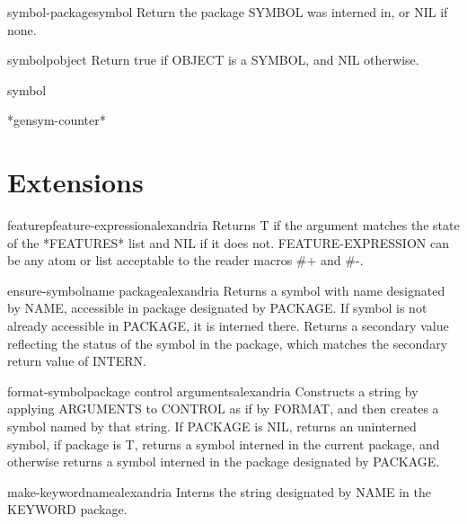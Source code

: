 \begin{function}{symbol-package}{symbol}{}{}
  Return the package SYMBOL was interned in, or NIL if none.
\end{function}

\begin{function}{symbolp}{object}{}{}
  Return true if OBJECT is a SYMBOL, and NIL otherwise.
\end{function}

\begin{class}{symbol}{}{}{}
  
\end{class}

\begin{variable}{*gensym-counter*}{}{}{}
  
\end{variable}

\section{Extensions}
\label{sec:extensions}

\begin{function}{featurep}{feature-expression}{alexandria}{}
  Returns T if the argument matches the state of the *FEATURES*
list and NIL if it does not. FEATURE-EXPRESSION can be any atom
or list acceptable to the reader macros \#+ and \#-.
\end{function}

\begin{function}{ensure-symbol}{name \op package}{alexandria}{}
  Returns a symbol with name designated by NAME, accessible in package
designated by PACKAGE. If symbol is not already accessible in PACKAGE, it is
interned there. Returns a secondary value reflecting the status of the symbol
in the package, which matches the secondary return value of INTERN.
\end{function}

\begin{function}{format-symbol}{package control \rest arguments}{alexandria}{}
  Constructs a string by applying ARGUMENTS to CONTROL as if by FORMAT, and
then creates a symbol named by that string. If PACKAGE is NIL, returns an
uninterned symbol, if package is T, returns a symbol interned in the current
package, and otherwise returns a symbol interned in the package designated by
PACKAGE.
\end{function}

\begin{function}{make-keyword}{name}{alexandria}{}
  Interns the string designated by NAME in the KEYWORD package.
\end{function}

